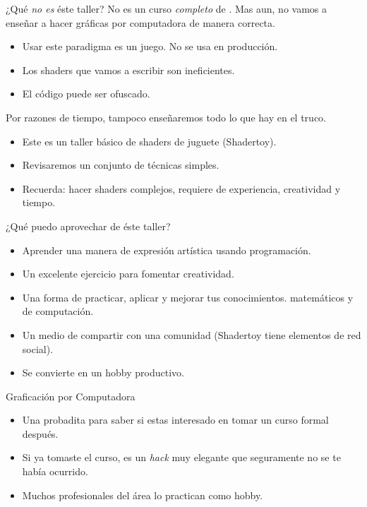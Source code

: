 \begin{frame}{¿Qué \emph{no es} éste taller?}
    No es un curso \emph{completo} de .
    Mas aun, no vamos a enseñar a hacer gráficas por computadora de manera correcta.
    \begin{itemize}
         \item Usar este paradigma \alert{es un juego}. No se usa en producción.
         \item Los shaders que vamos a escribir son ineficientes.
         \item El código puede ser ofuscado.
     \end{itemize}
     Por razones de tiempo, tampoco enseñaremos todo lo que hay en el truco.
     \begin{block}{}
         \begin{itemize}
            \item Este es un taller \alert{básico} de shaders de juguete (Shadertoy).
            \item Revisaremos un conjunto de técnicas simples.
            \item Recuerda: hacer shaders complejos, requiere de experiencia, creatividad y tiempo.
        \end{itemize}  
    \end{block}
\end{frame}

\begin{frame}{¿Qué puedo aprovechar de éste taller?}
    \begin{itemize}
         \item Aprender una manera de expresión artística usando programación.
         \item Un excelente ejercicio para fomentar creatividad.
         \item Una forma de practicar, aplicar y mejorar tus conocimientos. matemáticos y de computación.
         \item Un medio de compartir con una comunidad (Shadertoy tiene elementos de red social).
         \item Se convierte en un hobby productivo.
     \end{itemize}
     
     \begin{block}{Graficación por Computadora}
         \begin{itemize}
            \item Una probadita para saber si estas interesado en tomar un curso formal después.
            \item Si ya tomaste el curso, es un \emph{hack} muy elegante que seguramente no se te había ocurrido.
            \item Muchos profesionales del área lo practican como hobby.
        \end{itemize}  
    \end{block}
\end{frame}

